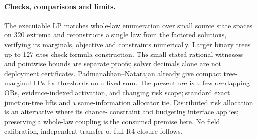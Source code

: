 \documentclass[11pt]{article}
\begin{document}
\paragraph{Checks, comparisons and limits.}
The executable LP matches whole-law enumeration over
small source state spaces on 320 extrema and reconstructs
a single law from the factored solutions, verifying its
marginals, objective and constraints numerically. Larger
binary trees up to 127 sites check formula construction.
The small stated rational witnesses and pointwise bounds
are separate proofs; solver decimals alone are not
deployment certificates. \href{https://arxiv.org/abs/1910.06321}{Padmanabhan--Natarajan}
already give compact tree-marginal LPs for thresholds on
a fixed sum. The present use is a few overlapping ORs,
evidence-indexed activation, and changing risk scope;
standard exact junction-tree lifts and a same-information
allocator tie. \href{https://groups.csail.mit.edu/mers/papers/Ono-Williams_AAMAS10.pdf}{Distributed
risk allocation} is an alternative where its chance-
constraint and budgeting interface applies; preserving a
whole-law coupling is the consumed premise here. No
field calibration, independent transfer or full R4
closure follows.
\end{document}
